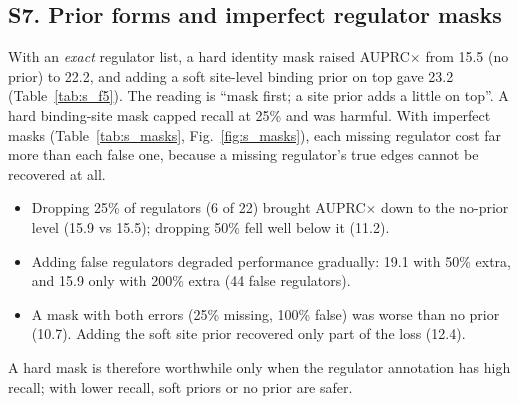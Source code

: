 \documentclass[10pt]{article}
\begin{document}
\begin{table}[h]\centering\small
\caption{\textbf{Three-gene check} ($b=c=1$, $\sigma_B=\sigma_C=\sigma_e=0.5$, $n=2{,}000$, 300 replicates).}\label{tab:s_f4three}
\end{table}
\begin{table}[h]\centering\small
\caption{\textbf{Indirect pairs called as edges} by perturbation status (BOND-V without prior; seeds 0--9 $\times$ 3 random halves of the perturbation set).}\label{tab:s_f4net}
\end{table}
\begin{table}[h]\centering\small
\caption{\textbf{Identifiability flag} (edge $j\to i$ flagged if some unperturbed $m$ has predicted $j\to m$ and $m\to i$ edges among the top $2E$).}\label{tab:s_f4flag}
\end{table}

\subsection*{S7. Prior forms and imperfect regulator masks}
With an \emph{exact} regulator list, a hard identity mask raised AUPRC$\times$ from 15.5 (no prior) to 22.2, and adding a soft site-level binding prior on top gave 23.2 (Table~\ref{tab:s_f5}). The reading is ``mask first; a site prior adds a little on top''.
A hard binding-site mask capped recall at 25\% and was harmful.
With imperfect masks (Table~\ref{tab:s_masks}, Fig.~\ref{fig:s_masks}), each missing regulator cost far more than each false one, because a missing regulator's true edges cannot be recovered at all.
\begin{itemize}
\item Dropping 25\% of regulators (6 of 22) brought AUPRC$\times$ down to the no-prior level (15.9 vs 15.5); dropping 50\% fell well below it (11.2).
\item Adding false regulators degraded performance gradually: 19.1 with 50\% extra, and 15.9 only with 200\% extra (44 false regulators).
\item A mask with both errors (25\% missing, 100\% false) was worse than no prior (10.7). Adding the soft site prior recovered only part of the loss (12.4).
\end{itemize}
A hard mask is therefore worthwhile only when the regulator annotation has high recall; with lower recall, soft priors or no prior are safer.
\end{document}
